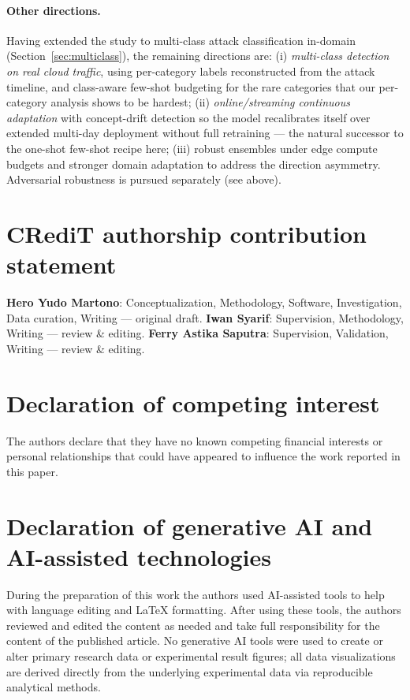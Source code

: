 \documentclass[preprint,12pt,authoryear]{elsarticle}
\begin{document}
\paragraph{Other directions.} Having extended the study to multi-class attack
classification in-domain (Section~\ref{sec:multiclass}), the remaining directions
are: (i) \emph{multi-class detection on real cloud traffic}, using per-category
labels reconstructed from the attack timeline, and class-aware few-shot budgeting
for the rare categories that our per-category analysis shows to be hardest;
(ii) \emph{online/streaming continuous adaptation} with concept-drift detection so
the model recalibrates itself over extended multi-day deployment without full
retraining --- the natural successor to the one-shot few-shot recipe here;
(iii) robust ensembles under edge compute budgets and stronger domain adaptation to
address the direction asymmetry. Adversarial robustness is pursued separately (see
above).

\section*{CRediT authorship contribution statement}
\textbf{Hero Yudo Martono}: Conceptualization, Methodology, Software,
Investigation, Data curation, Writing --- original draft. \textbf{Iwan Syarif}:
Supervision, Methodology, Writing --- review \& editing. \textbf{Ferry Astika
Saputra}: Supervision, Validation, Writing --- review \& editing.

\section*{Declaration of competing interest}
The authors declare that they have no known competing financial interests or
personal relationships that could have appeared to influence the work reported in
this paper.

\section*{Declaration of generative AI and AI-assisted technologies}
During the preparation of this work the authors used AI-assisted tools to help
with language editing and LaTeX formatting. After using these tools, the authors
reviewed and edited the content as needed and take full responsibility for the
content of the published article. No generative AI tools were used to create or
alter primary research data or experimental result figures; all data
visualizations are derived directly from the underlying experimental data via
reproducible analytical methods.
\end{document}
